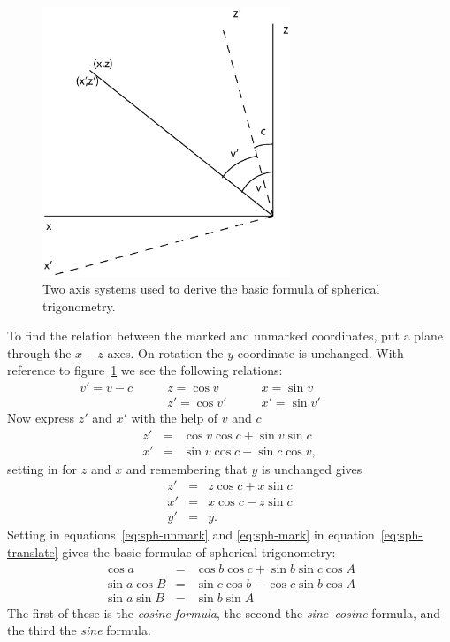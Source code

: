 \begin{figure}[h]
\centering
\includegraphics[width=0.66\textwidth]{sph-trig.eps}
\caption{Two axis systems used to derive the basic formula of spherical
trigonometry.}
\label{fig:sph-trig}
\end{figure}

To find the relation between the marked and unmarked coordinates, put
a plane through the $x-z$ axes. On rotation the $y$-coordinate is
unchanged. With reference to figure~\ref{fig:sph-trig} we see the
following relations:
\[
\begin{array}{cccc}
v'=v-c \qquad& z=\cos v\qquad  & x=\sin v \qquad& \qquad\\
       & z'=\cos v'\qquad& x' =\sin v'\qquad & \qquad
\end{array}
\]
Now express $z'$ and $x'$ with the help of $v$ and $c$
\begin{eqnarray}
z' & = & \cos v \cos c + \sin v \sin c\nonumber \\
x' & = & \sin v \cos c - \sin c \cos v,\nonumber
\end{eqnarray}
setting in for $z$ and $x$ and remembering that $y$ is unchanged gives
\begin{eqnarray}
z' & = & z\cos c + x \sin c \nonumber \\
x' & = & x \cos c - z \sin c \nonumber \\
y' & = & y. 
\label{eq:sph-translate}
\end{eqnarray}
Setting in equations~\ref{eq:sph-unmark} and \ref{eq:sph-mark} in
equation~\ref{eq:sph-translate} gives the basic formulae of spherical
trigonometry:
\begin{eqnarray} 
\cos a &=& \cos b\cos c+\sin b\sin c\cos A \\
\sin a \cos B &=& \sin c \cos b-\cos c\sin b\cos A\\
\sin a \sin B &=& \sin b \sin A
\end{eqnarray}
The first of these is the {\it cosine formula}, the second the {\it
  sine--cosine} formula, and the third the {\it sine} formula.

